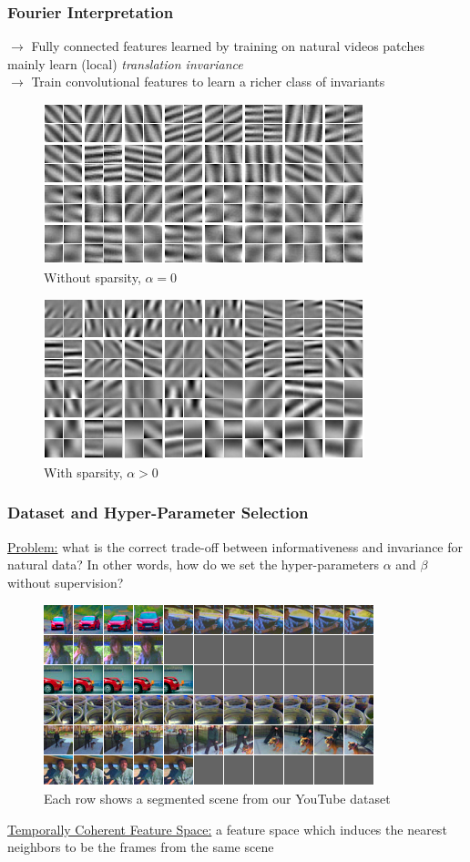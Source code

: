 \documentclass{beamer}
\begin{document}
\begin{frame}
\frametitle{Fourier Interpretation}
$\rightarrow$ Fully connected features learned by training on natural videos patches mainly learn (local) \emph{translation invariance} \\
$\rightarrow$ Train convolutional features to learn a richer class of invariants
\begin{center} 
\begin{figure}
\includegraphics[scale=0.38]{./Figures/Project1/slow_dec_pooling_sub.png}
\caption{Without sparsity, $\alpha = 0$}
\end{figure} 
\begin{figure}
\includegraphics[scale=0.38]{./Figures/Project1/slow_dec_l1_pooling.png}
\caption{With sparsity, $\alpha > 0$}
\end{figure} 
\end{center} 
\end{frame} 

\begin{frame}
\frametitle{Dataset and Hyper-Parameter Selection}
\underline{Problem:} what is the correct trade-off between informativeness and invariance for natural data? In other words, how do we set the hyper-parameters $\alpha$ and $\beta$ without supervision? 
\begin{center} 
\begin{figure}
\includegraphics[scale=0.40]{./Figures/Project1/youtube.png}
\caption{Each row shows a segmented scene from our YouTube dataset}
\end{figure}
\end{center}
\underline{Temporally Coherent Feature Space:} a feature space which induces the nearest neighbors to be the frames from the same scene
\end{frame} 
\end{document}
